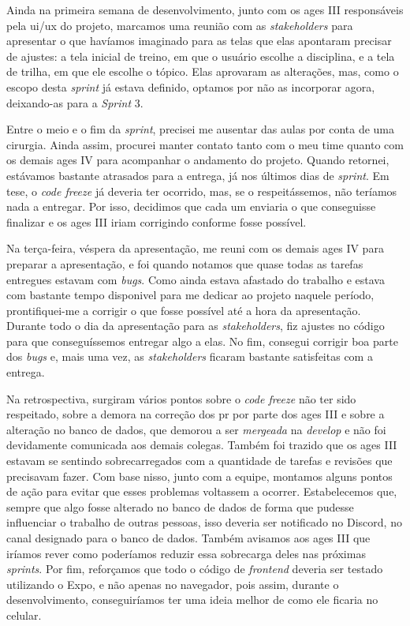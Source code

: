 Ainda na primeira semana de desenvolvimento, junto com os \ac{ages} III responsáveis pela \ac{ui}/\ac{ux} do projeto, marcamos uma reunião com as \textit{stakeholders} para apresentar o que havíamos imaginado para as telas que elas apontaram precisar de ajustes: a tela inicial de treino, em que o usuário escolhe a disciplina, e a tela de trilha, em que ele escolhe o tópico. Elas aprovaram as alterações, mas, como o escopo desta \textit{sprint} já estava definido, optamos por não as incorporar agora, deixando-as para a \textit{Sprint} 3.

Entre o meio e o fim da \textit{sprint}, precisei me ausentar das aulas por conta de uma cirurgia. Ainda assim, procurei manter contato tanto com o meu time quanto com os demais \ac{ages} IV para acompanhar o andamento do projeto. Quando retornei, estávamos bastante atrasados para a entrega, já nos últimos dias de \textit{sprint}. Em tese, o \textit{code freeze} já deveria ter ocorrido, mas, se o respeitássemos, não teríamos nada a entregar. Por isso, decidimos que cada um enviaria o que conseguisse finalizar e os \ac{ages} III iriam corrigindo conforme fosse possível.

Na terça-feira, véspera da apresentação, me reuni com os demais \ac{ages} IV para preparar a apresentação, e foi quando notamos que quase todas as tarefas entregues estavam com \textit{bugs}. Como ainda estava afastado do trabalho e estava com bastante tempo disponivel para me dedicar ao projeto naquele período, prontifiquei-me a corrigir o que fosse possível até a hora da apresentação. Durante todo o dia da apresentação para as \textit{stakeholders}, fiz ajustes no código para que conseguíssemos entregar algo a elas. No fim, consegui corrigir boa parte dos \textit{bugs} e, mais uma vez, as \textit{stakeholders} ficaram bastante satisfeitas com a entrega.

Na retrospectiva, surgiram vários pontos sobre o \textit{code freeze} não ter sido respeitado, sobre a demora na correção dos \ac{pr} por parte dos \ac{ages} III e sobre a alteração no banco de dados, que demorou a ser \textit{mergeada} na \textit{develop} e não foi devidamente comunicada aos demais colegas. Também foi trazido que os \ac{ages} III estavam se sentindo sobrecarregados com a quantidade de tarefas e revisões que precisavam fazer. Com base nisso, junto com a equipe, montamos alguns pontos de ação para evitar que esses problemas voltassem a ocorrer. Estabelecemos que, sempre que algo fosse alterado no banco de dados de forma que pudesse influenciar o trabalho de outras pessoas, isso deveria ser notificado no Discord, no canal designado para o banco de dados. Também avisamos aos \ac{ages} III que iríamos rever como poderíamos reduzir essa sobrecarga deles nas próximas \textit{sprints}. Por fim, reforçamos que todo o código de \textit{frontend} deveria ser testado utilizando o Expo, e não apenas no navegador, pois assim, durante o desenvolvimento, conseguiríamos ter uma ideia melhor de como ele ficaria no celular.
